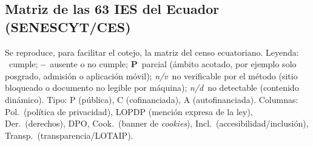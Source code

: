 \documentclass[pdflatex,sn-basic,Numbered]{sn-jnl}
\newcommand{\si}{\ding{51}}
\newcommand{\no}{\textcolor{gris}{\textbf{--}}}
\newcommand{\nv}{\textsl{\footnotesize n/v}}
\newcommand{\nd}{\textsl{\footnotesize n/d}}
\theoremstyle{thmstyleone}
\theoremstyle{thmstyletwo}
\theoremstyle{thmstylethree}
\begin{document}
\begin{appendices}
\section{Matriz de las 63 IES del Ecuador (SENESCYT/CES)}
\label{ap:ecuador}
Se reproduce, para facilitar el cotejo, la matriz del censo ecuatoriano. Leyenda: \si~cumple; \no~ausente o no cumple; \textbf{P}~parcial (ámbito acotado, por ejemplo solo posgrado, admisión o aplicación móvil); \nv~no verificable por el método (sitio bloqueado o documento no legible por máquina); \nd~no detectable (contenido dinámico). Tipo: P (pública), C (cofinanciada), A (autofinanciada). Columnas: Pol.\ (política de privacidad), LOPDP (mención expresa de la ley), Der.\ (derechos), DPO, Cook.\ (banner de \emph{cookies}), Incl.\ (accesibilidad/inclusión), Transp.\ (transparencia/LOTAIP).


\end{appendices}
\end{document}
